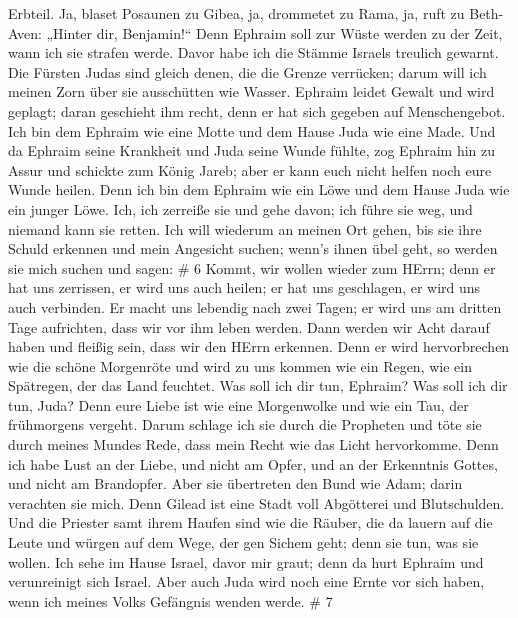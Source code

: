Erbteil.  Ja, blaset Posaunen zu Gibea, ja, drommetet zu
Rama, ja, ruft zu Beth-Aven: „Hinter dir, Benjamin!{}`` 
Denn Ephraim soll zur Wüste werden zu der Zeit, wann ich sie strafen
werde. Davor habe ich die Stämme Israels treulich gewarnt. 
Die Fürsten Judas sind gleich denen, die die Grenze verrücken; darum
will ich meinen Zorn über sie ausschütten wie Wasser. 
Ephraim leidet Gewalt und wird geplagt; daran geschieht ihm recht, denn
er hat sich gegeben auf Menschengebot.  Ich bin dem Ephraim
wie eine Motte und dem Hause Juda wie eine Made.  Und da
Ephraim seine Krankheit und Juda seine Wunde fühlte, zog Ephraim hin zu
Assur und schickte zum König Jareb; aber er kann euch nicht helfen noch
eure Wunde heilen.  Denn ich bin dem Ephraim wie ein Löwe
und dem Hause Juda wie ein junger Löwe. Ich, ich zerreiße sie und gehe
davon; ich führe sie weg, und niemand kann sie retten.  Ich
will wiederum an meinen Ort gehen, bis sie ihre Schuld erkennen und mein
Angesicht suchen; wenn's ihnen übel geht, so werden sie mich suchen und
sagen: \# 6  Kommt, wir wollen wieder zum HErrn; denn er hat
uns zerrissen, er wird uns auch heilen; er hat uns geschlagen, er wird
uns auch verbinden.  Er macht uns lebendig nach zwei Tagen;
er wird uns am dritten Tage aufrichten, dass wir vor ihm leben werden.
 Dann werden wir Acht darauf haben und fleißig sein, dass
wir den HErrn erkennen. Denn er wird hervorbrechen wie die schöne
Morgenröte und wird zu uns kommen wie ein Regen, wie ein Spätregen, der
das Land feuchtet.  Was soll ich dir tun, Ephraim? Was soll
ich dir tun, Juda? Denn eure Liebe ist wie eine Morgenwolke und wie ein
Tau, der frühmorgens vergeht.  Darum schlage ich sie durch
die Propheten und töte sie durch meines Mundes Rede, dass mein Recht wie
das Licht hervorkomme.  Denn ich habe Lust an der Liebe, und
nicht am Opfer, und an der Erkenntnis Gottes, und nicht am Brandopfer.
 Aber sie übertreten den Bund wie Adam; darin verachten sie
mich.  Denn Gilead ist eine Stadt voll Abgötterei und
Blutschulden.  Und die Priester samt ihrem Haufen sind wie
die Räuber, die da lauern auf die Leute und würgen auf dem Wege, der gen
Sichem geht; denn sie tun, was sie wollen.  Ich sehe im
Hause Israel, davor mir graut; denn da hurt Ephraim und verunreinigt
sich Israel.  Aber auch Juda wird noch eine Ernte vor sich
haben, wenn ich meines Volks Gefängnis wenden werde. \# 7 
